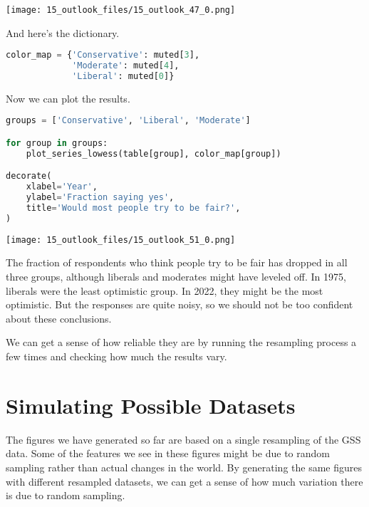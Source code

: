 \begin{center}
\texttt{[image: 15\_outlook\_files/15\_outlook\_47\_0.png]}
\end{center}

And here's the dictionary.

\begin{lstlisting}[language=Python,style=source]
color_map = {'Conservative': muted[3],
             'Moderate': muted[4],
             'Liberal': muted[0]}
\end{lstlisting}

\pagebreak

Now we can plot the results.

\begin{lstlisting}[language=Python,style=source]
groups = ['Conservative', 'Liberal', 'Moderate']

for group in groups:
    plot_series_lowess(table[group], color_map[group])

decorate(
    xlabel='Year',
    ylabel='Fraction saying yes',
    title='Would most people try to be fair?',
)
\end{lstlisting}

\begin{center}
\texttt{[image: 15\_outlook\_files/15\_outlook\_51\_0.png]}
\end{center}

The fraction of respondents who think people try to be fair has dropped
in all three groups, although liberals and moderates might have leveled
off. In 1975, liberals were the least optimistic group. In 2022, they
might be the most optimistic. But the responses are quite noisy, so we
should not be too confident about these conclusions.

We can get a sense of how reliable they are by running the resampling
process a few times and checking how much the results vary.

\section{Simulating Possible
Datasets}\label{simulating-possible-datasets}

The figures we have generated so far are based on a single resampling of
the GSS data. Some of the features we see in these figures might be due
to random sampling rather than actual changes in the world. By
generating the same figures with different resampled datasets, we can
get a sense of how much variation there is due to random sampling.

